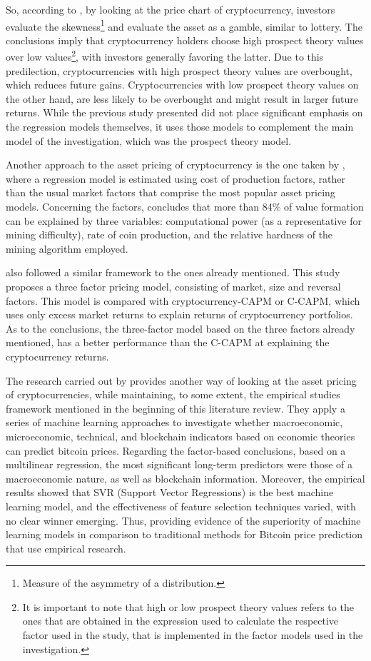 So, according to \parencite{thoma2020prospect}, by looking at the price chart of cryptocurrency, investors evaluate the skewness\footnote{Measure of the asymmetry of a distribution.} and evaluate the asset as a gamble, similar to lottery. The conclusions imply that cryptocurrency holders choose high prospect theory values over low values\footnote{It is important to note that high or low prospect theory values refers to the ones that are obtained in the expression used to calculate the respective factor used in the study, that is implemented in the factor models used in the investigation.}, with investors generally favoring the latter. Due to this predilection, cryptocurrencies with high prospect theory values are overbought, which reduces future gains. Cryptocurrencies with low prospect theory values on the other hand, are less likely to be overbought and might result in larger future returns. While the previous study presented did not place significant emphasis on the regression models themselves, it uses those models to complement the main model of the investigation, which was the prospect theory model.

Another approach to the asset pricing of cryptocurrency is the one taken by \parencite{HAYES20171308}, where a regression model is estimated using cost of production factors, rather than the usual market factors that comprise the most popular asset pricing models. Concerning the factors, \parencite{HAYES20171308} concludes that more than 84\% of value formation can be explained by three variables: computational power (as a representative for mining difficulty), rate of coin production, and the relative hardness of the mining algorithm employed.

\parencite{Shen2020} also followed a similar framework to the ones already mentioned. This study proposes a three factor pricing model, consisting of market, size and reversal factors. This model is compared with cryptocurrency-CAPM or C-CAPM, which uses only excess market returns to explain returns of cryptocurrency portfolios. As to the conclusions, the three-factor model based on the three factors already mentioned, has a better performance than the C-CAPM at explaining the cryptocurrency returns.

The research carried out by \parencite{Erfanian2022} provides another way of looking at the asset pricing of cryptocurrencies, while maintaining, to some extent, the empirical studies framework mentioned in the beginning of this literature review. They apply a series of machine learning approaches to investigate whether macroeconomic, microeconomic, technical, and blockchain indicators based on economic theories can predict bitcoin prices. Regarding the factor-based conclusions, based on a multilinear regression, the most significant long-term predictors were those of a macroeconomic nature, as well as blockchain information. Moreover, the empirical results showed that SVR (Support Vector Regressions) is the best machine learning model, and the effectiveness of feature selection techniques varied, with no clear winner emerging. Thus, providing evidence of the superiority of machine learning models in comparison to traditional methods for Bitcoin price prediction that use empirical research.

